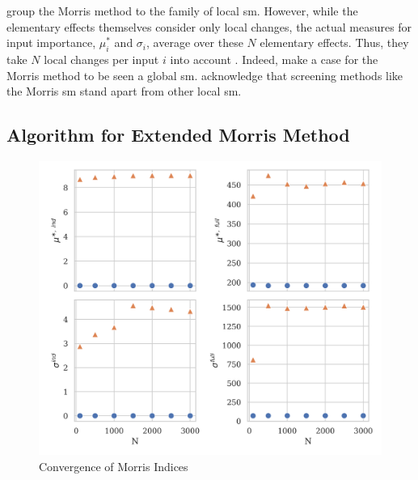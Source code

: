 \citet{BP16} group the Morris method to the family of local sm. However, while the elementary effects themselves consider only local changes, the actual measures for input importance, $\mu_i^\ast$ and $\sigma_i$, average over these $N$ elementary effects. Thus, they take $N$ local changes per input $i$ into account \citep{M91}. Indeed, \citet{CCS11} make a case for the Morris method to be seen a global sm. \citet{BP16} acknowledge that screening methods like the Morris sm stand apart from other local sm.

\subsection{Algorithm for Extended Morris Method}

\begin{figure}[t]
	\caption{Convergence of Morris Indices}
    \label{morris_convergence}
	\vspace*{-4mm}
	\centering
	\includegraphics[scale=0.9]{../figures/morris_convergence.png}
\end{figure}

